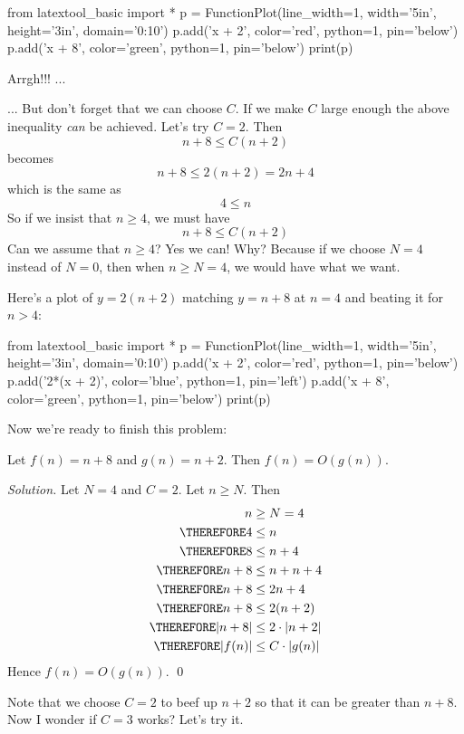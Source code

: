 \begin{python}
from latextool_basic import *
p = FunctionPlot(line_width=1, width='5in', height='3in', domain='0:10')
p.add('x + 2', color='red', python=1, pin='below')
p.add('x + 8', color='green', python=1, pin='below')
print(p)
\end{python}

Arrgh!!! ...

... But don't forget that we can choose $C$.
If we make $C$ large enough the above inequality \textit{can} be achieved.
Let's try $C = 2$.
Then 
\[
n + 8 \leq C(n + 2)
\]
becomes
\[
n + 8 \leq 2(n + 2) = 2n + 4
\]
which is the same as
\[
4 \leq n
\]
So if we insist that $n \geq 4$, we must have
\[
n + 8 \leq C(n + 2)
\]
Can we assume that $n \geq 4$?
Yes we can!
Why?
Because if we choose $N = 4$ instead of $N = 0$,
then when $n \geq N = 4$,
we would have what we want.

Here's a plot of $y = 2(n+2)$ matching $y = n + 8$
at $n = 4$ and beating it for $n >4$:
\begin{python}
from latextool_basic import *
p = FunctionPlot(line_width=1, width='5in', height='3in', domain='0:10')
p.add('x + 2', color='red', python=1, pin='below')
p.add('2*(x + 2)', color='blue', python=1, pin='left')
p.add('x + 8', color='green', python=1, pin='below')
print(p)
\end{python}


Now we're ready to finish this problem:

\begin{eg}
Let $f(n) = n + 8$ and $g(n) = n + 2$.
Then $f(n) = O(g(n))$.
\end{eg}

\textit{Solution.}
Let $N = 4$ and $C = 2$.
Let $n \geq N$.
Then
\begin{align*}
           n &\geq N = 4 \\
\THEREFORE 4 &\leq n \\
\THEREFORE 8 &\leq n + 4 \\
\THEREFORE n + 8 &\leq n + n + 4 \\
\THEREFORE n + 8 &\leq 2n + 4 \\
\THEREFORE n + 8 &\leq 2(n + 2) \\
\THEREFORE |n + 8| &\leq 2 \cdot |n + 2| \\
\THEREFORE |f(n)| &\leq C \cdot |g(n)|
\end{align*}
Hence $f(n) = O(g(n))$.
\qed

Note that we choose $C = 2$ to beef up $n + 2$ so that it can be greater
than $n + 8$.
Now I wonder if $C = 3$ works?
Let's try it.

